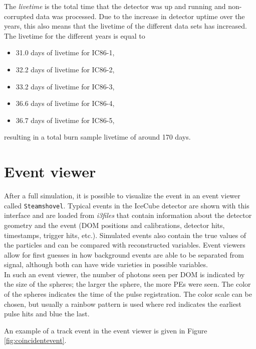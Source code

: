\noindent The \textit{livetime} is the total time that the detector was up and running and non-corrupted data was processed. Due to the increase in detector uptime over the years, this also means that the livetime of the different data sets has increased. The livetime for the different years is equal to
\vspace{2mm}
\begin{itemize}
\item 31.0 days of livetime for IC86-1,
\item 32.2 days of livetime for IC86-2,
\item 33.2 days of livetime for IC86-3,
\item 36.6 days of livetime for IC86-4,
\item 36.7 days of livetime for IC86-5,
\end{itemize}
\vspace{2mm}

\noindent resulting in a total burn sample livetime of around 170 days.

\section{Event viewer}
After a full simulation, it is possible to visualize the event in an event viewer called \texttt{Steamshovel}. Typical events in the IceCube detector are shown with this interface and are loaded from \textit{i3files} that contain information about the detector geometry and the event (DOM positions and calibrations, detector hits, timestamps, trigger hits, etc.). Simulated events also contain the true values of the particles and can be compared with reconstructed variables. Event viewers allow for first guesses in how background events are able to be separated from signal, although both can have wide varieties in possible variables.\\

\noindent In such an event viewer, the number of photons seen per DOM is indicated by the size of the spheres; the larger the sphere, the more PEs were seen. The color of the spheres indicates the time of the pulse registration. The color scale can be chosen, but usually a rainbow pattern is used where red indicates the earliest pulse hits and blue the last. 

An example of a track event in the event viewer is given in Figure \ref{fig:coincidentevent}.